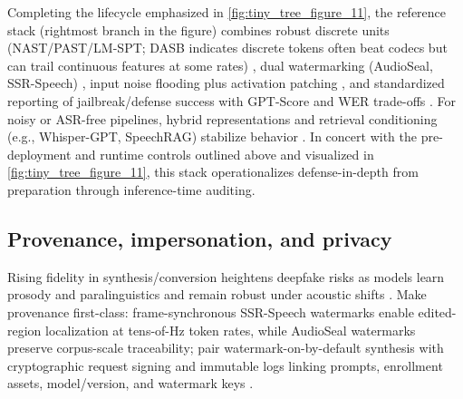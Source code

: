 Completing the lifecycle emphasized in \autoref{fig:tiny_tree_figure_11}, the reference stack (rightmost branch in the figure) combines robust discrete units (NAST/PAST/LM-SPT; DASB indicates discrete tokens often beat codecs but can trail continuous features at some rates) \cite{mousavi2024dasbdiscreteaudiospeechbenchmark,mousavi2024howshouldweextractdiscreteaudiotokenssel,onda2025benchmarkingprosodyencodingdiscretespeec,har-tuv2025pastphoneticacousticspeechtokenizer,jo2025lmsptalignedsemanticdistillationspeechto,messica2024nastnoiseawarespeechtokenizationlanguage}, dual watermarking (AudioSeal, SSR-Speech) \cite{zhao2024advancingspeechlanguagemodelsscalingsupe,wang2025ssrspeechtowardsstablesaferobustzeroshot}, input noise flooding plus activation patching \cite{peri2024speechguardexploringadversarialrobustnes,djanibekov2025spiritpatchingspeechlanguagemodelsagains}, and standardized reporting of jailbreak/defense success with GPT-Score and WER trade-offs \cite{peri2024speechguardexploringadversarialrobustnes,djanibekov2025spiritpatchingspeechlanguagemodelsagains,vashishth2024stabspeechtokenizerassessmentbenchmark}. For noisy or ASR-free pipelines, hybrid representations and retrieval conditioning (e.g., Whisper-GPT, SpeechRAG) stabilize behavior \cite{verma2024whispergpthybridrepresentationaudiolarge,min2025speechretrievalaugmentedgenerationwithou}. In concert with the pre-deployment and runtime controls outlined above and visualized in \autoref{fig:tiny_tree_figure_11}, this stack operationalizes defense-in-depth from preparation through inference-time auditing.

\subsection{Provenance, impersonation, and privacy} \label{subsec:Provenance, impersonation, and privacy}
Rising fidelity in synthesis/conversion heightens deepfake risks as models learn prosody and paralinguistics and remain robust under acoustic shifts \cite{chen2025variationalframeworkimprovingnaturalness,verma2024whispergpthybridrepresentationaudiolarge,maimon2025salmonsuiteacousticlanguagemodelevaluati,entry2025augmentationinvariantdiscreterepresentat}. Make provenance first-class: frame-synchronous SSR-Speech watermarks enable edited-region localization at tens-of-Hz token rates, while AudioSeal watermarks preserve corpus-scale traceability; pair watermark-on-by-default synthesis with cryptographic request signing and immutable logs linking prompts, enrollment assets, model/version, and watermark keys \cite{wang2025ssrspeechtowardsstablesaferobustzeroshot,zhao2024advancingspeechlanguagemodelsscalingsupe,gong2024seamlessexpressivelmspeechlanguagemodele}.

